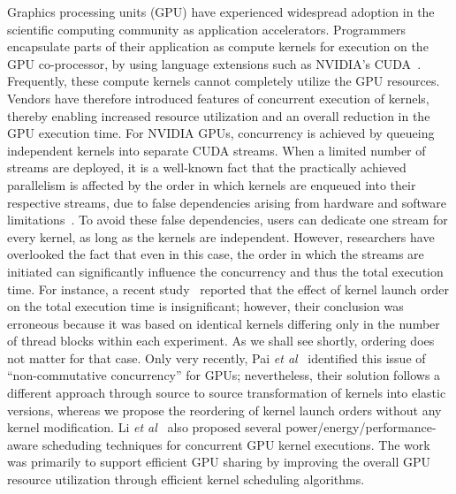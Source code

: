 \documentclass[twocolumn]{el-author}
\begin{document}
Graphics processing units (GPU) have experienced widespread adoption in the scientific computing community as application accelerators.  
Programmers encapsulate parts of their application as compute kernels for execution on the GPU co-processor, by using 
language extensions such as NVIDIA's CUDA~\cite{m_cuda6}. Frequently, these compute kernels cannot completely utilize the GPU resources.  Vendors have 
therefore introduced features of concurrent execution of kernels, thereby enabling increased resource utilization and an overall reduction in the 
GPU execution time. For NVIDIA GPUs, concurrency is 
achieved by queueing independent kernels into separate CUDA streams.  
When a limited number of streams are deployed, it is a well-known fact that the practically achieved parallelism is affected by the order in which kernels
are enqueued into their respective streams, due to false dependencies arising from hardware and software limitations~\cite{webinar12}.  To avoid these false dependencies, 
users can dedicate one stream for every kernel, as long as the kernels are independent.  However, researchers have overlooked the fact that even in this case,
the order in which the streams are initiated can significantly influence the concurrency and thus the total execution time.  For instance, a recent study~\cite{lu2012gpu} 
reported that the effect of kernel launch order on the total execution time is insignificant; however, their conclusion was erroneous because it was based on 
identical kernels differing only in the number of thread blocks within each experiment.  As we shall see shortly, ordering does not matter for that case.  
Only very recently, 
Pai \emph{et al}~\cite{pai2013improving} identified this issue of ``non-commutative concurrency'' for GPUs; nevertheless, their solution follows a different approach 
through source to source transformation of kernels into elastic versions, whereas we propose the reordering of kernel launch orders without any kernel modification. Li \emph{et al}~\cite{cf14, icpads15, c_gpusch} also proposed several power/energy/performance-aware scheduding techniques for concurrent GPU kernel executions. The work was primarily to support efficient GPU sharing \cite{c_vgpu, cf12, computers} by improving the overall GPU resource utilization through efficient kernel scheduling algorithms.    
\end{document}
